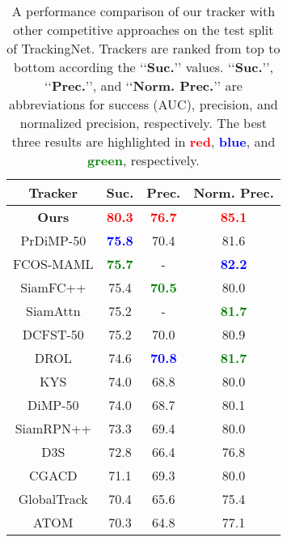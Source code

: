 \documentclass[final]{cvpr}
\begin{document}
\begin{table}[!tbp]
 \centering
 \caption{\label{tab:trackingnet_tab}A performance comparison of our tracker with other competitive approaches on the test split of TrackingNet. Trackers are ranked from top to bottom according the \lq\lq{\textbf{Suc.}}\rq\rq{} values. \lq\lq{\textbf{Suc.}}\rq\rq{}, \lq\lq{\textbf{Prec.}}\rq\rq{}, and \lq\lq{\textbf{Norm. Prec.}}\rq\rq{} are abbreviations for success (AUC), precision, and normalized precision, respectively. The best three results are highlighted in \textcolor{red}{\textbf{red}}, \textcolor{blue}{\textbf{blue}}, and \textcolor{green}{\textbf{green}}, respectively.}
 \vspace{-1.0em}
 \begin{tabular}{cccc}
  \toprule
  \textbf{Tracker} & \textbf{Suc.} & \textbf{Prec.} & \textbf{Norm. Prec.}\\
  \midrule
  \textbf{Ours} & \textcolor{red}{\textbf{80.3}} & \textcolor{red}{\textbf{76.7}} & \textcolor{red}{\textbf{85.1}} \\
  PrDiMP-50 \cite{danelljan2020probabilistic} & \textcolor{blue}{\textbf{75.8}} & 70.4 & 81.6 \\
  FCOS-MAML \cite{wang2020tracking} & \textcolor{green}{\textbf{75.7}} & - & \textcolor{blue}{\textbf{82.2}} \\
  SiamFC++ \cite{xu2020siamfc++} & 75.4 & \textcolor{green}{\textbf{70.5}} & 80.0 \\
  SiamAttn \cite{yu2020deformable} & 75.2 & - &  \textcolor{green}{\textbf{81.7}} \\
  DCFST-50 \cite{zhenglearning} & 75.2 & 70.0 & 80.9 \\
  DROL \cite{zhou2020discriminative} & 74.6 & \textcolor{blue}{\textbf{70.8}} &  \textcolor{green}{\textbf{81.7}} \\
  KYS \cite{bhat2020know} & 74.0 & 68.8 & 80.0 \\
  DiMP-50 \cite{bhat2019learning} & 74.0 & 68.7 & 80.1 \\
  SiamRPN++ \cite{li2019siamrpn++} & 73.3 & 69.4 & 80.0 \\
  D3S \cite{lukezic2020d3s} & 72.8 & 66.4 & 76.8 \\
  CGACD \cite{du2020correlation} & 71.1 & 69.3 & 80.0 \\
  GlobalTrack \cite{huang2020globaltrack} & 70.4 & 65.6 & 75.4 \\
  ATOM \cite{danelljan2019atom} & 70.3 & 64.8 & 77.1 \\
  \bottomrule
 \end{tabular}
 \vspace{-1.0em}
\end{table}
\end{document}
